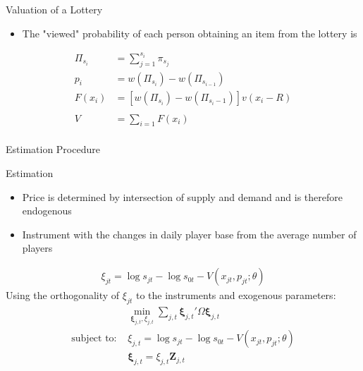 \documentclass[presentation]{beamer}
\begin{document}
\begin{frame}[label={sec:org1314f81}]{Valuation of a Lottery}
\begin{itemize}
\item The "viewed" probability of each person obtaining an item from the
lottery is
\end{itemize}
\begin{align*}
  \Pi_{s_i} &= \sum_{j=1}^{s_i} \pi_{s_j}\\
  p_i &= w( \Pi_{s_i}) - w(\Pi_{s_{i-1}})\\
  F(x_i) &= \left[  w( \Pi_{s_i}) - w(\Pi_{s_i - 1}) \right] v( x_i - R)\\
  \\
  V &= \sum_{i=1} F(x_i)\\            
\end{align*}
\end{frame}

\begin{frame}[label={sec:org5b7ecd5}]{Estimation Procedure}
\end{frame}


\begin{frame}[label={sec:orga6ec0d5}]{Estimation}
\begin{itemize}
\item Price is determined by intersection of supply and demand and is
therefore endogenous
\item Instrument with the changes in daily player base from the average
number of players
\end{itemize}

\begin{align*}
  \xi_{jt} = \log s_{jt} - \log s_{0t} - V( x_{jt}, p_{jt}; \theta)
\end{align*}
Using the orthogonality of \(\xi_{jt}\) to the instruments and exogenous
parameters:
\begin{align*}
  &\min_{\bm{\xi}_{j,t}, \xi_{j,t}} \sum_{j,t}\bm{\xi}_{j,t}' \Omega \bm{\xi}_{j,t}\\
  \text{subject to: } &\xi_{j,t} = \log s_{jt} - \log s_{0t} - V( x_{jt}, p_{jt}; \theta)\\
  &\bm{\xi}_{j,t} = \xi_{j,t} \bm{Z}_{j,t}  
\end{align*}
\end{frame}
\end{document}
